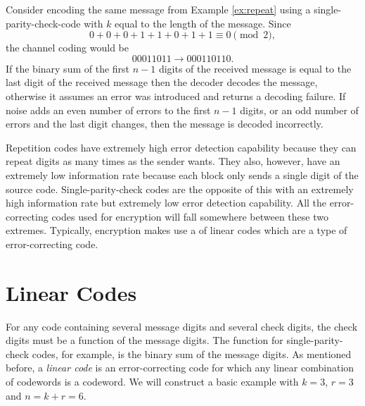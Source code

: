 \begin{example} \label{ex:single}
    Consider encoding the same message from Example \ref{ex:repeat} using a single-parity-check-code with $k$ equal to the length of the message. Since
    \[
        0 + 0 + 0 + 1 + 1 + 0 + 1 + 1 \equiv 0 \pmod{2},
    \]
    the channel coding would be
    \[
        00011011 \to 000110110.
    \]
    If the binary sum of the first $n - 1$ digits of the received message is equal to the last digit of the received message then the decoder decodes the message, otherwise it assumes an error was introduced and returns a decoding failure. If noise adds an even number of errors to the first $n - 1$ digits, or an odd number of errors and the last digit changes, then the message is decoded incorrectly.
\end{example}

Repetition codes have extremely high error detection capability because they can repeat digits as many times as the sender wants. They also, however, have an extremely low information rate because each block only sends a single digit of the source code. Single-parity-check codes are the opposite of this with an extremely high information rate but extremely low error detection capability. All the error-correcting codes used for encryption will fall somewhere between these two extremes. Typically, encryption makes use a of linear codes which are a type of error-correcting code.

\section{Linear Codes}\label{linearcodessection}

For any code containing several message digits and several check digits, the check digits must be a function of the message digits. The function for single-parity-check codes, for example, is the binary sum of the message digits. As mentioned before, a \textit{linear code} is an error-correcting code for which any linear combination of codewords is a codeword. We will construct a basic example with $k = 3$, $r = 3$ and $n = k + r = 6$.

